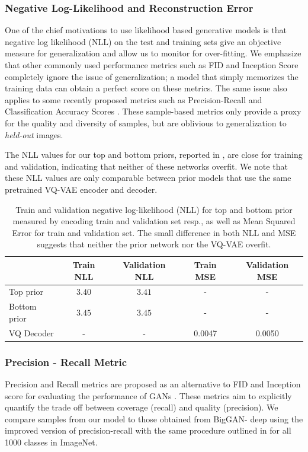 \subsubsection{Negative Log-Likelihood and Reconstruction Error}
One of the chief motivations to use likelihood based generative models is that negative log likelihood (NLL) on the test and training sets give an objective measure for generalization and allow us to monitor for over-fitting. We emphasize that other commonly used performance metrics such as FID and Inception Score completely ignore the issue of generalization; a model that simply memorizes the training data can obtain a perfect score on these metrics. The same issue also applies to some recently proposed metrics such as Precision-Recall \cite{sajjadi2018assessing, NvidiaPR} and Classification Accuracy Scores \cite{ravuri2019classification}. These sample-based metrics only provide a proxy for the quality and diversity of samples, but are oblivious to generalization to \emph{held-out} images.

\par
The NLL values for our top and bottom priors, reported in ,  are close for training and validation, indicating that neither of these networks overfit.  We note that these NLL values are only comparable between prior models that use the same pretrained VQ-VAE encoder and decoder. 

\begin{table}[ht!]
\centering
\begin{tabular}{@{}l|cccc@{}}
    &  Train NLL &  Validation NLL  & Train MSE & Validation MSE\\
\hline    
Top prior & $3.40$ & $3.41$ & - & -\\
Bottom prior & $3.45$ & $3.45$ & - & -\\
\hline
VQ Decoder & - & - & 0.0047 & 0.0050 \\
\bottomrule
\end{tabular}
\caption{Train and validation negative log-likelihood (NLL) for top and bottom prior measured by encoding train and validation set resp., as well as Mean Squared Error for train and validation set. The small difference in both NLL and MSE suggests that neither the prior network nor the VQ-VAE overfit.}
\label{tbl:nll-imnet}
\end{table}


\subsubsection{Precision - Recall Metric}
Precision and Recall metrics are proposed as an alternative to FID and Inception score for evaluating the performance of GANs \cite{sajjadi2018assessing, NvidiaPR}. These metrics aim to explicitly quantify the trade off between coverage (recall) and quality (precision). We compare samples from our model to those obtained from BigGAN- deep using the improved version of precision-recall with the same procedure outlined in \cite{NvidiaPR} for all 1000 classes in ImageNet. 

